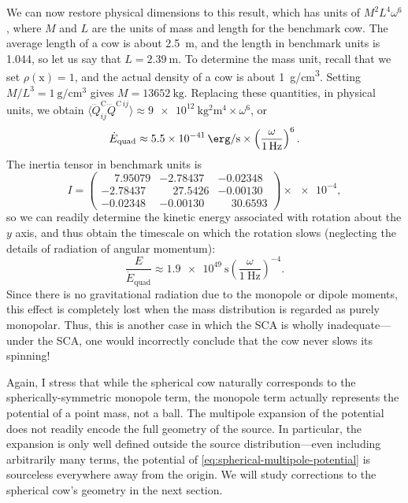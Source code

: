 \documentclass[
    prd, twocolumn, nofootinbib, amsmath, amssymb,
    aps, floatfix, preprintnumbers
]{revtex4-2}
\newcommand{\bb}[1]{\bm{\mathrm{#1}}}
\begin{document}
We can now restore physical dimensions to this result, which has units of $M^2L^4\omega^6$, where $M$ and $L$ are the units of mass and length for the benchmark cow. The average length of a cow is about \qty{2.5}{\meter}, and the length in benchmark units is 1.044, so let us say that $L=\qty{2.39}{\meter}$. To determine the mass unit, recall that we set $\rho(\bb x) = 1$, and the actual density of a cow is about \qty{1}{\gram/\centi\meter^3}. Setting $M/L^3 = \qty{1}{\gram/\centi\meter^3}$ gives $M = \qty{13652}{\kilo\gram}$. Replacing these quantities, in physical units, we obtain $\langle\dddot{Q}^{\mathrm{C}}_{ij}\dddot{Q}^{\mathrm{C}\,ij}\rangle \approx \qty{9e12}{\kilo\gram^2\meter^4}\times\omega^6$, or
\begin{equation}
    \dot E_{\mathrm{quad}} \approx \qty{5.5e-41}{\erg/\second} \times
        \left(\frac{\omega}{\qty{1}{\hertz}}\right)^6
        .
\end{equation}
The inertia tensor in benchmark units is
\begin{equation}
    I =
    \begin{pmatrix}
         \phantom{-}7.95079 & -2.78437 & -0.02348\\
        -2.78437 &  \phantom{-}27.5426 & -0.00130\\
        -0.02348 & -0.00130 &  \phantom{-}30.6593
    \end{pmatrix}
    \times\num{e-4}
    ,
\end{equation}
so we can readily determine the kinetic energy associated with rotation about the $y$ axis, and thus obtain the timescale on which the rotation slows (neglecting the details of radiation of angular momentum):
\begin{equation}
    \frac{E}{\dot E_{\mathrm{quad}}} \approx \qty{1.9e49}{\second}
    \left(\frac{\omega}{\qty{1}{\hertz}}\right)^{-4}
    .
\end{equation}
Since there is no gravitational radiation due to the monopole or dipole moments, this effect is completely lost when the mass distribution is regarded as purely monopolar. Thus, this is another case in which the SCA is wholly inadequate---under the SCA, one would incorrectly conclude that the cow never slows its spinning!

Again, I stress that while the spherical cow naturally corresponds to the spherically-symmetric monopole term, the monopole term actually represents the potential of a point mass, not a ball. The multipole expansion of the potential does not readily encode the full geometry of the source. In particular, the expansion is only well defined outside the source distribution---even including arbitrarily many terms, the potential of \cref{eq:spherical-multipole-potential} is sourceless everywhere away from the origin. We will study corrections to the spherical cow's geometry in the next section.
\end{document}
